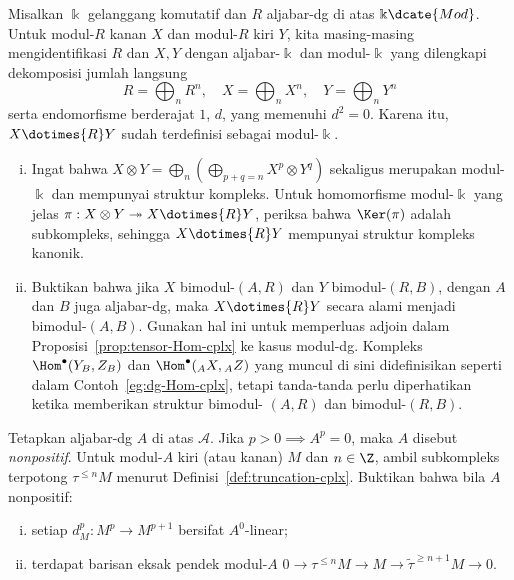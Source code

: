 \begin{Exercises}
	\item Misalkan $\Bbbk$ gelanggang komutatif dan $R$ aljabar-dg di atas
	$\Bbbk\dcate{Mod}$. Untuk modul-$R$ kanan $X$ dan modul-$R$ kiri $Y$,
	kita masing-masing mengidentifikasi $R$ dan $X,Y$ dengan aljabar-$\Bbbk$
	dan modul-$\Bbbk$ yang dilengkapi dekomposisi jumlah langsung
	\[ R = \bigoplus_n R^n, \quad X = \bigoplus_n X^n, \quad Y = \bigoplus_n Y^n \]
	serta endomorfisme berderajat $1$, $d$, yang memenuhi $d^2=0$. Karena itu,
	$X\dotimes{R}Y$ sudah terdefinisi sebagai modul-$\Bbbk$.
	\begin{enumerate}[(i)]
		\item Ingat bahwa
		$X\otimes Y=\bigoplus_n(\bigoplus_{p+q=n}X^p\otimes Y^q)$ sekaligus
		merupakan modul-$\Bbbk$ dan mempunyai struktur kompleks. Untuk
		homomorfisme modul-$\Bbbk$ yang jelas
		$\pi:X\otimes Y\twoheadrightarrow X\dotimes{R}Y$, periksa bahwa
		$\Ker(\pi)$ adalah subkompleks, sehingga $X\dotimes{R}Y$ mempunyai
		struktur kompleks kanonik.

		\item Buktikan bahwa jika $X$ bimodul-$(A,R)$ dan $Y$ bimodul-$(R,B)$,
		dengan $A$ dan $B$ juga aljabar-dg, maka $X\dotimes{R}Y$ secara alami
		menjadi bimodul-$(A,B)$. Gunakan hal ini untuk memperluas adjoin dalam
		Proposisi~\ref{prop:tensor-Hom-cplx} ke kasus modul-dg. Kompleks
		$\Hom^\bullet(Y_B,Z_B)$ dan $\Hom^\bullet({}_AX,{}_AZ)$ yang muncul di
		sini didefinisikan seperti dalam Contoh~\ref{eg:dg-Hom-cplx}, tetapi
		tanda-tanda perlu diperhatikan ketika memberikan struktur bimodul-
		$(A,R)$ dan bimodul-$(R,B)$.
	\end{enumerate}

	\item Tetapkan aljabar-dg $A$ di atas $\mathcal{A}$. Jika
	$p>0\implies A^p=0$, maka $A$ disebut \emph{nonpositif}. Untuk modul-$A$
	kiri (atau kanan) $M$ dan $n\in\Z$, ambil subkompleks terpotong
	$\tau^{\leq n}M$ menurut Definisi~\ref{def:truncation-cplx}. Buktikan
	bahwa bila $A$ nonpositif:
	\begin{enumerate}[(i)]
		\item setiap $d_M^p:M^p\to M^{p+1}$ bersifat $A^0$-linear;
		\item terdapat barisan eksak pendek modul-$A$
		$0\to\tau^{\leq n}M\to M\to\tilde\tau^{\geq n+1}M\to0$.
	\end{enumerate}


\end{Exercises}
